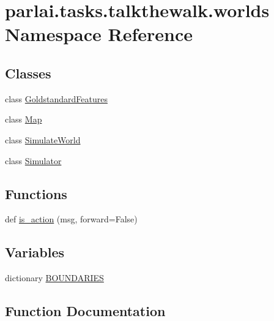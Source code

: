 \hypertarget{namespaceparlai_1_1tasks_1_1talkthewalk_1_1worlds}{}\section{parlai.\+tasks.\+talkthewalk.\+worlds Namespace Reference}
\label{namespaceparlai_1_1tasks_1_1talkthewalk_1_1worlds}
\subsection*{Classes}
\begin{DoxyCompactItemize}
\item 
class \hyperlink{classparlai_1_1tasks_1_1talkthewalk_1_1worlds_1_1GoldstandardFeatures}{Goldstandard\+Features}
\item 
class \hyperlink{classparlai_1_1tasks_1_1talkthewalk_1_1worlds_1_1Map}{Map}
\item 
class \hyperlink{classparlai_1_1tasks_1_1talkthewalk_1_1worlds_1_1SimulateWorld}{Simulate\+World}
\item 
class \hyperlink{classparlai_1_1tasks_1_1talkthewalk_1_1worlds_1_1Simulator}{Simulator}
\end{DoxyCompactItemize}
\subsection*{Functions}
\begin{DoxyCompactItemize}
\item 
def \hyperlink{namespaceparlai_1_1tasks_1_1talkthewalk_1_1worlds_aa28536df060005c301225d766f91cb13}{is\+\_\+action} (msg, forward=False)
\end{DoxyCompactItemize}
\subsection*{Variables}
\begin{DoxyCompactItemize}
\item 
dictionary \hyperlink{namespaceparlai_1_1tasks_1_1talkthewalk_1_1worlds_a9fdf0043ff89ba3cc64a6afd08305efe}{B\+O\+U\+N\+D\+A\+R\+I\+ES}
\end{DoxyCompactItemize}


\subsection{Function Documentation}
\mbox{\label{namespaceparlai_1_1tasks_1_1talkthewalk_1_1worlds_aa28536df060005c301225d766f91cb13}} 
